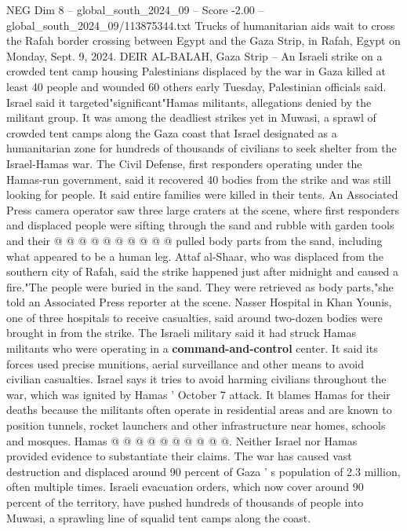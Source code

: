 \begin{textsample}{NEG Dim 8 – global\_south\_2024\_09 – Score -2.00 – global\_south\_2024\_09/113875344.txt}  \label{ex:f8_neg_158}
Trucks of humanitarian aids wait to cross the Rafah border crossing between Egypt and the Gaza Strip, in Rafah, Egypt on Monday, Sept. 9, 2024.
DEIR AL-BALAH, Gaza Strip -- An Israeli strike on a crowded tent camp housing Palestinians displaced by the war in Gaza killed at least 40 people and wounded 60 others early Tuesday, Palestinian officials said.
Israel said it targeted"significant"Hamas militants, allegations denied by the militant group.
It was among the deadliest strikes yet in Muwasi, a sprawl of crowded tent camps along the Gaza coast that Israel designated as a humanitarian zone for hundreds of thousands of civilians to seek shelter from the Israel-Hamas war.
The Civil Defense, first responders operating under the Hamas-run government, said it recovered 40 bodies from the strike and was still looking for people.
It said entire families were killed in their tents.
An Associated Press camera operator saw three large craters at the scene, where first responders and displaced people were sifting through the sand and rubble with garden tools and their @ @ @ @ @ @ @ @ @ @ pulled body parts from the sand, including what appeared to be a human leg.
Attaf al-Shaar, who was displaced from the southern city of Rafah, said the strike happened just after midnight and caused a fire."The people were buried in the sand.
They were retrieved as body parts,"she told an Associated Press reporter at the scene.
Nasser Hospital in Khan Younis, one of three hospitals to receive casualties, said around two-dozen bodies were brought in from the strike.
The Israeli military said it had struck Hamas militants who were operating in a \textbf{command-and-control} center.
It said its forces used precise munitions, aerial surveillance and other means to avoid civilian casualties.
Israel says it tries to avoid harming civilians throughout the war, which was ignited by Hamas ' October 7 attack.
It blames Hamas for their deaths because the militants often operate in residential areas and are known to position tunnels, rocket launchers and other infrastructure near homes, schools and mosques.
Hamas @ @ @ @ @ @ @ @ @ @.
Neither Israel nor Hamas provided evidence to substantiate their claims.
The war has caused vast destruction and displaced around 90 percent of Gaza ' s population of 2.3 million, often multiple times.
Israeli evacuation orders, which now cover around 90 percent of the territory, have pushed hundreds of thousands of people into Muwasi, a sprawling line of squalid tent camps along the coast.

\end{textsample}
